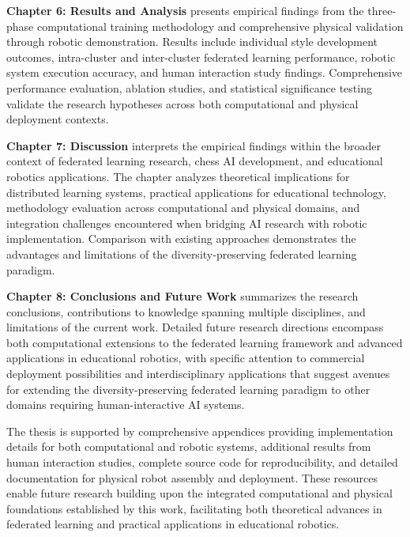 \textbf{Chapter 6: Results and Analysis} presents empirical findings from the three-phase computational training methodology and comprehensive physical validation through robotic demonstration. Results include individual style development outcomes, intra-cluster and inter-cluster federated learning performance, robotic system execution accuracy, and human interaction study findings. Comprehensive performance evaluation, ablation studies, and statistical significance testing validate the research hypotheses across both computational and physical deployment contexts.

\textbf{Chapter 7: Discussion} interprets the empirical findings within the broader context of federated learning research, chess AI development, and educational robotics applications. The chapter analyzes theoretical implications for distributed learning systems, practical applications for educational technology, methodology evaluation across computational and physical domains, and integration challenges encountered when bridging AI research with robotic implementation. Comparison with existing approaches demonstrates the advantages and limitations of the diversity-preserving federated learning paradigm.

\textbf{Chapter 8: Conclusions and Future Work} summarizes the research conclusions, contributions to knowledge spanning multiple disciplines, and limitations of the current work. Detailed future research directions encompass both computational extensions to the federated learning framework and advanced applications in educational robotics, with specific attention to commercial deployment possibilities and interdisciplinary applications that suggest avenues for extending the diversity-preserving federated learning paradigm to other domains requiring human-interactive AI systems.

The thesis is supported by comprehensive appendices providing implementation details for both computational and robotic systems, additional results from human interaction studies, complete source code for reproducibility, and detailed documentation for physical robot assembly and deployment. These resources enable future research building upon the integrated computational and physical foundations established by this work, facilitating both theoretical advances in federated learning and practical applications in educational robotics.
